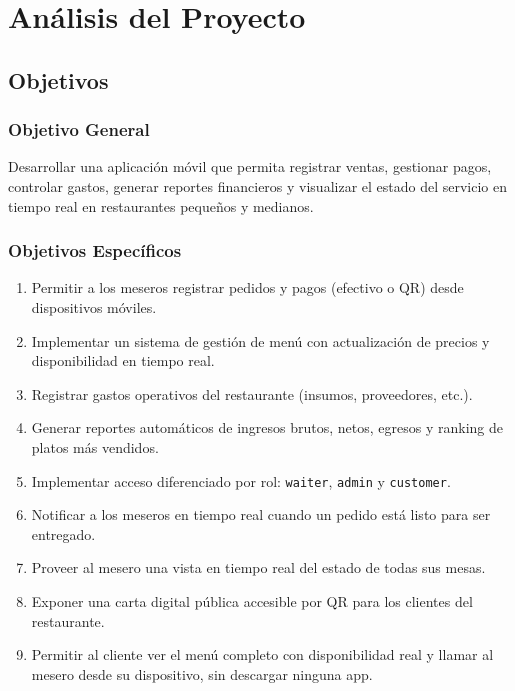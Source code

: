 \chapter{Análisis del Proyecto}

\section{Objetivos}

\subsection{Objetivo General}

Desarrollar una aplicación móvil que permita registrar ventas, gestionar pagos,
controlar gastos, generar reportes financieros y visualizar el estado del servicio
en tiempo real en restaurantes pequeños y medianos.

\subsection{Objetivos Específicos}

\begin{enumerate}[leftmargin=1.8em]
  \item Permitir a los meseros registrar pedidos y pagos (efectivo o QR) desde
        dispositivos móviles.
  \item Implementar un sistema de gestión de menú con actualización de precios y
        disponibilidad en tiempo real.
  \item Registrar gastos operativos del restaurante (insumos, proveedores, etc.).
  \item Generar reportes automáticos de ingresos brutos, netos, egresos y ranking
        de platos más vendidos.
  \item Implementar acceso diferenciado por rol: \texttt{waiter}, \texttt{admin} y
        \texttt{customer}.
  \item Notificar a los meseros en tiempo real cuando un pedido está listo para
        ser entregado.
  \item Proveer al mesero una vista en tiempo real del estado de todas sus mesas.
  \item Exponer una carta digital pública accesible por QR para los clientes del
        restaurante.
  \item Permitir al cliente ver el menú completo con disponibilidad real y llamar
        al mesero desde su dispositivo, sin descargar ninguna app.
\end{enumerate}

